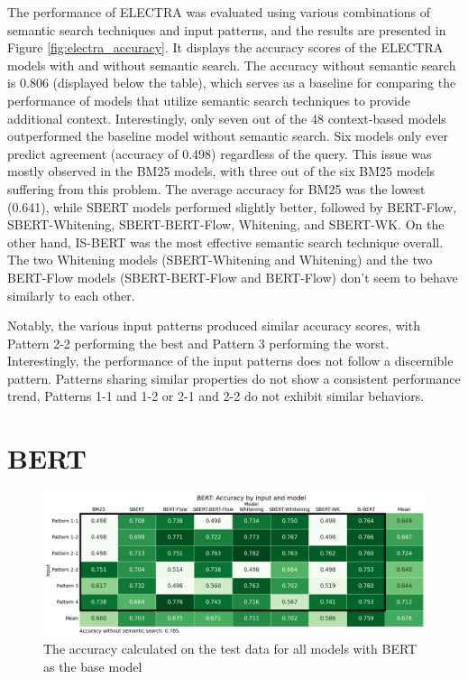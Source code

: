 The performance of ELECTRA was evaluated using various combinations of semantic search techniques and input patterns, and the results are presented in Figure \ref{fig:electra_accuracy}. It displays the accuracy scores of the ELECTRA models with and without semantic search. The accuracy without semantic search is 0.806 (displayed below the table), which serves as a baseline for comparing the performance of models that utilize semantic search techniques to provide additional context. Interestingly, only seven out of the 48 context-based models outperformed the baseline model without semantic search. Six models only ever predict agreement (accuracy of 0.498) regardless of the query. This issue was mostly observed in the BM25 models, with three out of the six BM25 models suffering from this problem. The average accuracy for BM25 was the lowest (0.641), while SBERT models performed slightly better, followed by BERT-Flow, SBERT-Whitening, SBERT-BERT-Flow, Whitening, and SBERT-WK. On the other hand, IS-BERT was the most effective semantic search technique overall. The two Whitening models (SBERT-Whitening and Whitening) and the two BERT-Flow models (SBERT-BERT-Flow and BERT-Flow) don't seem to behave similarly to each other.

Notably, the various input patterns produced similar accuracy scores, with Pattern 2-2 performing the best and Pattern 3 performing the worst. Interestingly, the performance of the input patterns does not follow a discernible pattern. Patterns sharing similar properties do not show a consistent performance trend, Patterns 1-1 and 1-2 or 2-1 and 2-2 do not exhibit similar behaviors.

\section{BERT}

\begin{figure}[h]
\centering
\includegraphics[width = 1\linewidth]{figures/bert_accuracy.png}
\caption{The accuracy calculated on the test data for all models with BERT as the base model}
\label{fig:bert_accuracy}
\end{figure}

